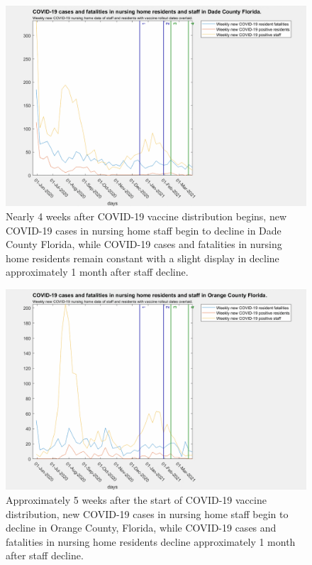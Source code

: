 \documentclass[twoside]{article}
\begin{document}
\begin{multicols}{2}
\begin{figure}[H]
	\includegraphics[width=\linewidth]{images/dade_nursing_home_with_vaccine.png}
	\caption{Nearly 4 weeks after COVID-19 vaccine distribution begins, new COVID-19 cases in nursing home staff begin to decline in Dade County Florida, while COVID-19 cases and fatalities in nursing home residents remain constant with a slight display in decline approximately 1 month after staff decline. }
	\label{fig:images/dade_nursing_home_with_vaccineLabel}
\end{figure}

\begin{figure}[H]
	\includegraphics[width=\linewidth]{images/orange_nursing_home_with_vaccine.png}
	\caption{Approximately 5 weeks after the start of COVID-19 vaccine distribution, new COVID-19 cases in nursing home staff begin to decline in Orange County, Florida, while COVID-19 cases and fatalities in nursing home residents decline approximately 1 month after staff decline. }
	\label{fig:images/orange_nursing_home_with_vaccineLabel}
\end{figure}


\end{multicols}
\end{document}
